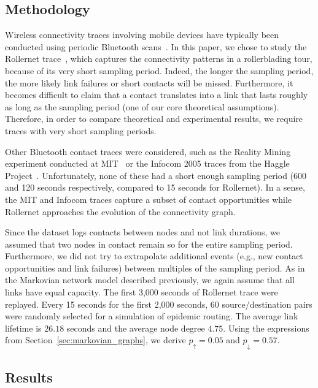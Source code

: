 \documentclass[final,journal,letterpaper]{IEEEtran}
\begin{document}
\subsection{Methodology}

Wireless connectivity traces involving mobile devices have typically been conducted using periodic Bluetooth scans~\cite{chaintreau_mobility,mit,tournoux08_rollernet}. In this paper, we chose to study the Rollernet trace~\cite{tournoux08_rollernet}, which captures the connectivity patterns in a rollerblading tour, because of its very short sampling period. Indeed, the longer the sampling period, the more likely link failures or short contacts will be missed. Furthermore, it becomes difficult to claim that a contact translates into a link that lasts roughly as long as the sampling period (one of our core theoretical assumptions). Therefore, in order to compare theoretical and experimental results, we require traces with very short sampling periods.

Other Bluetooth contact traces were considered, such as the Reality Mining experiment conducted at MIT~\cite{mit} or the Infocom 2005 traces from the Haggle Project~\cite{chaintreau_mobility}. Unfortunately, none of these had a short enough sampling period (600 and 120 seconds respectively, compared to 15 seconds for Rollernet). In a sense, the MIT and Infocom traces capture a subset of contact opportunities while Rollernet approaches the evolution of the connectivity graph.

Since the dataset logs contacts between nodes and not link durations, we assumed that two nodes in contact remain so for the entire sampling period. Furthermore, we did not try to extrapolate additional events (e.g., new contact opportunities and link failures) between multiples of the sampling period. As in the Markovian network model described previously, we again assume that all links have equal capacity. The first 3,000 seconds of Rollernet trace were replayed. Every 15 seconds for the first 2,000 seconds, 60 source/destination pairs were randomly selected for a simulation of epidemic routing. The average link lifetime is $26.18$ seconds and the average node degree $4.75$. Using the expressions from Section~\ref{sec:markovian_graphs}, we derive $p_\uparrow=0.05$ and $p_\downarrow=0.57$.

\subsection{Results}
\end{document}
